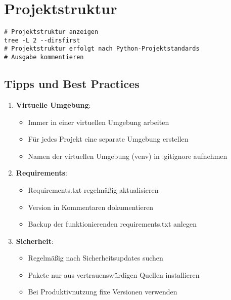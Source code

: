\documentclass{vorlage-design-main}
\begin{document}
\section{Projektstruktur}\label{projektstruktur}

\begin{lstlisting}
# Projektstruktur anzeigen
tree -L 2 --dirsfirst
# Projektstruktur erfolgt nach Python-Projektstandards
# Ausgabe kommentieren
\end{lstlisting}

\subsection{Tipps und Best Practices}\label{tipps-und-best-practices}

\begin{enumerate}
\def\labelenumi{\arabic{enumi}.}

\item
  \textbf{Virtuelle Umgebung}:

  \begin{itemize}
  
  \item
    Immer in einer virtuellen Umgebung arbeiten
  \item
    Für jedes Projekt eine separate Umgebung erstellen
  \item
    Namen der virtuellen Umgebung (venv) in .gitignore aufnehmen
  \end{itemize}
\item
  \textbf{Requirements}:

  \begin{itemize}
  
  \item
    Requirements.txt regelmäßig aktualisieren
  \item
    Version in Kommentaren dokumentieren
  \item
    Backup der funktionierenden requirements.txt anlegen
  \end{itemize}
\item
  \textbf{Sicherheit}:

  \begin{itemize}
  
  \item
    Regelmäßig nach Sicherheitsupdates suchen
  \item
    Pakete nur aus vertrauenswürdigen Quellen installieren
  \item
    Bei Produktivnutzung fixe Versionen verwenden
  \end{itemize}
\end{enumerate}
\end{document}
